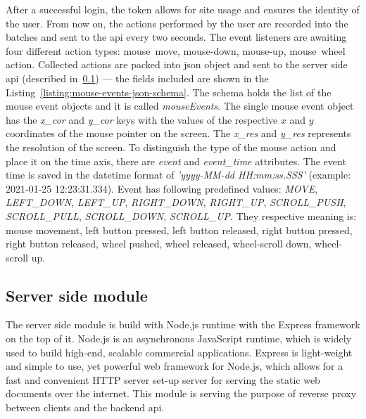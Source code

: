 After a successful login, the token allows for site usage and ensures the identity of the user.
From now on, the actions performed by the user are recorded into the batches and sent to the \gls{api} every two seconds.
The event listeners are awaiting four different action types: \mbox{mouse move}, \mbox{mouse-down}, \mbox{mouse-up}, \mbox{mouse wheel} action.
Collected actions are packed into \gls{json} object and sent to the server side \gls{api} (described in~\ref{subsec:server-side-module}) --- the fields included are shown in the Listing~\ref{listing:mouse-events-json-schema}.
The schema holds the list of the mouse event objects and it is called \textit{mouseEvents}.
The single mouse event object has the \textit{x\_cor} and \textit{y\_cor} keys with the values of the respective $x$ and $y$ coordinates of the mouse pointer on the screen.
The \textit{x\_res} and \textit{y\_res} represents the resolution of the screen.
To distinguish the type of the mouse action and place it on the time axis, there are \textit{event} and \textit{event\_time} attributes.
The event time is saved in the datetime format of \textit{'yyyy-MM-dd HH:mm:ss.SSS'} (example: 2021-01-25 12:23:31.334).
Event has following predefined values: \textit{MOVE}, \textit{LEFT\_DOWN}, \textit{LEFT\_UP}, \textit{RIGHT\_DOWN}, \textit{RIGHT\_UP}, \textit{SCROLL\_PUSH}, \textit{SCROLL\_PULL}, \textit{SCROLL\_DOWN}, \textit{SCROLL\_UP}\@.
They respective meaning is: mouse movement, left button pressed, left button released, right button pressed, right button released, wheel pushed, wheel released, wheel-scroll down, wheel-scroll up.



\subsection{Server side module}\label{subsec:server-side-module}
The server side module is build with Node.js runtime with the Express framework on the top of it.
Node.js is an asynchronous JavaScript runtime, which is widely used to build high-end, scalable commercial applications.
Express is light-weight and simple to use, yet powerful web framework for Node.js, which allows for a fast and convenient HTTP server set-up server for serving the static web documents over the internet.
This module is serving the purpose of reverse proxy between clients and the backend \gls{api}.

